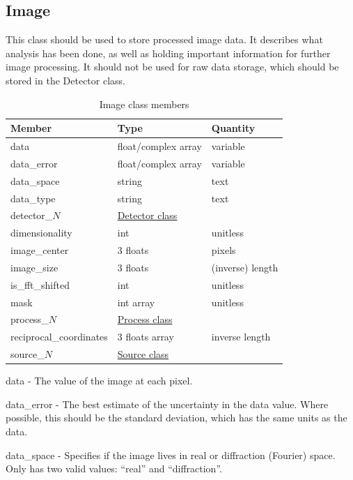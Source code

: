 \documentclass[usletter,11pt]{article}
\newcommand{\member}[2]
{ \noindent
{ \color{softBlue}  #1 - } #2
\vspace{0.2cm}
}
\begin{document}
\subsection{Image}
\label{table:image}

This class should be used to store processed image data. It describes
what analysis has been done, as well as holding important information
for further image processing. It should not be used for raw data
storage, which should be stored in the Detector class.

\begin{table}[h!]\sffamily \footnotesize
\caption{Image class members}

\begin{tabular}{p{4.5cm} p{4.5cm}  p{2.5cm} }

\toprule
\bfseries Member     & \bfseries Type & \bfseries Quantity \\
\midrule
data &  float/complex array & variable \\
data\_error & float/complex array & variable \\
data\_space & string & text \\
data\_type & string & text \\
detector\_$N$ &  \hyperref[table:detector]{Detector class} & \\
dimensionality & int & unitless \\
image\_center & 3 floats & pixels \\
image\_size & 3 floats & (inverse) length \\
is\_fft\_shifted & int & unitless \\ 
mask & int array & unitless \\
process\_$N$ &  \hyperref[table:process]{Process class} & \\
reciprocal\_coordinates & 3 floats array & inverse length  \\
source\_$N$ &  \hyperref[table:source]{Source class} & \\
\bottomrule
\end{tabular}
\end{table}

\member{data}{The value of the image at each pixel.}

\member{data\_error}{The best estimate of the uncertainty in the data
 value. Where possible, this should be the standard deviation, which
 has the same units as the data.}

\member{data\_space}{Specifies if the image lives in real or diffraction (Fourier)
 space. Only has two valid values: ``real'' and ``diffraction''. }
\end{document}
